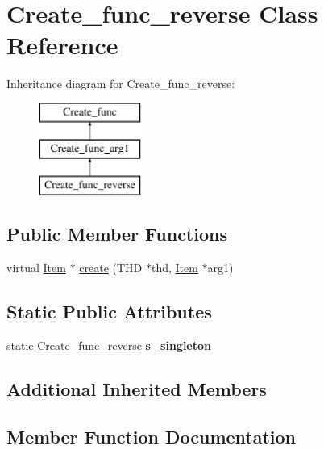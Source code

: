 \hypertarget{classCreate__func__reverse}{}\section{Create\+\_\+func\+\_\+reverse Class Reference}
\label{classCreate__func__reverse}
Inheritance diagram for Create\+\_\+func\+\_\+reverse\+:\begin{figure}[H]
\begin{center}
\leavevmode
\includegraphics[height=3.000000cm]{classCreate__func__reverse}
\end{center}
\end{figure}
\subsection*{Public Member Functions}
\begin{DoxyCompactItemize}
\item 
virtual \mbox{\hyperlink{classItem}{Item}} $\ast$ \mbox{\hyperlink{classCreate__func__reverse_ac2acd892cac7493f9c1492a9e9901ceb}{create}} (T\+HD $\ast$thd, \mbox{\hyperlink{classItem}{Item}} $\ast$arg1)
\end{DoxyCompactItemize}
\subsection*{Static Public Attributes}
\begin{DoxyCompactItemize}
\item 
\mbox{\label{classCreate__func__reverse_af6a11ae3c4cbb835a59e66e59c36dd68}} 
static \mbox{\hyperlink{classCreate__func__reverse}{Create\+\_\+func\+\_\+reverse}} {\bfseries s\+\_\+singleton}
\end{DoxyCompactItemize}
\subsection*{Additional Inherited Members}


\subsection{Member Function Documentation}
\mbox{\label{classCreate__func__reverse_ac2acd892cac7493f9c1492a9e9901ceb}} 
